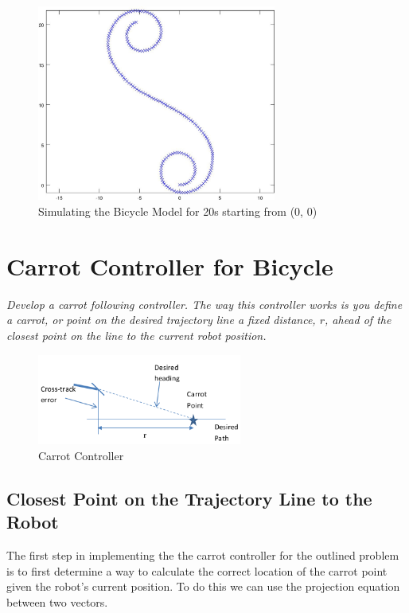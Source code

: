 \documentclass{article}
\begin{document}
\begin{figure}[H]
	\centering
	\includegraphics[width=0.7\textwidth]{images/bicycle_motion_20s.jpg}
	\caption{Simulating the Bicycle Model for 20s starting from (0, 0)}
	\label{fig:bicycle_20s}
\end{figure}


\newpage
\section{Carrot Controller for Bicycle}

\textit{Develop a carrot following controller.  The way this controller works is you define a carrot, or point on the desired trajectory line a fixed distance, $r$, ahead of the closest point on the line to the current robot position.}

\begin{figure}[H]
	\centering
	\includegraphics[width=0.6\textwidth]{images/carrot_controller.png}
	\caption{Carrot Controller}
	\label{fig:carrot_controller}
\end{figure}


\subsection{Closest Point on the Trajectory Line to the Robot}
The first step in implementing the the carrot controller for the outlined problem is to first determine a way to calculate the correct location of the carrot point given the robot's current position. To do this we can use the projection equation between two vectors. 
\end{document}
